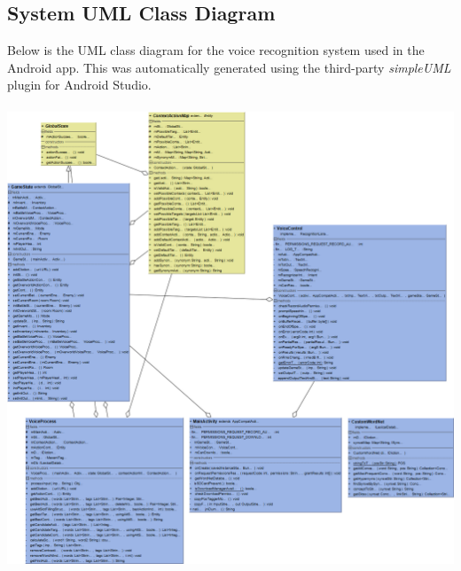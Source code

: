\documentclass[12pt]{article}
\begin{document}
\subsection{System UML Class Diagram}
Below is the UML class diagram for the voice recognition system used in the Android app. This was automatically generated using the third-party \textit{simpleUML} plugin for Android Studio.
\\
\\
\includegraphics[scale=0.33]{system-uml.png}

\newpage
{}

\end{document}
